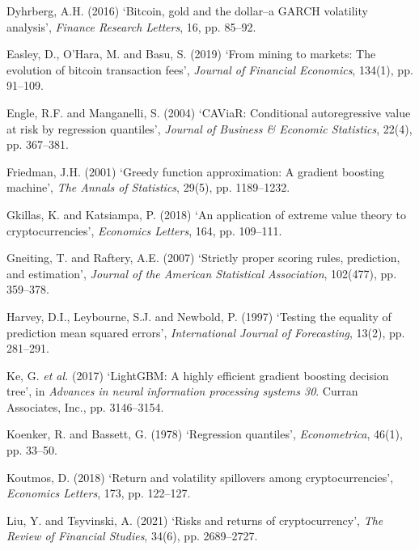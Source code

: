 \documentclass[
  a4paper,
  DIV=11,
  numbers=noendperiod]{scrreprt}
\newlength{\cslhangindent}
\newenvironment{CSLReferences}[2] %
 {\begin{list}{}{%
  \setlength{\itemindent}{0pt}
  \setlength{\leftmargin}{0pt}
  \setlength{\parsep}{0pt}
  \ifodd #1
   \setlength{\leftmargin}{\cslhangindent}
   \setlength{\itemindent}{-1\cslhangindent}
  \fi
  \setlength{\itemsep}{#2\baselineskip}}}
 {\end{list}}
\begin{document}
\begin{CSLReferences}{0}{1}
Dyhrberg, A.H. (2016) {`Bitcoin, gold and the dollar--a GARCH volatility
analysis'}, \emph{Finance Research Letters}, 16, pp. 85--92.

Easley, D., O'Hara, M. and Basu, S. (2019) {`From mining to markets: The
evolution of bitcoin transaction fees'}, \emph{Journal of Financial
Economics}, 134(1), pp. 91--109.

Engle, R.F. and Manganelli, S. (2004) {`{CAViaR}: Conditional
autoregressive value at risk by regression quantiles'}, \emph{Journal of
Business \& Economic Statistics}, 22(4), pp. 367--381.

Friedman, J.H. (2001) {`Greedy function approximation: A gradient
boosting machine'}, \emph{The Annals of Statistics}, 29(5), pp.
1189--1232.

Gkillas, K. and Katsiampa, P. (2018) {`An application of extreme value
theory to cryptocurrencies'}, \emph{Economics Letters}, 164, pp.
109--111.

Gneiting, T. and Raftery, A.E. (2007) {`Strictly proper scoring rules,
prediction, and estimation'}, \emph{Journal of the American Statistical
Association}, 102(477), pp. 359--378.

Harvey, D.I., Leybourne, S.J. and Newbold, P. (1997) {`Testing the
equality of prediction mean squared errors'}, \emph{International
Journal of Forecasting}, 13(2), pp. 281--291.

Ke, G. \emph{et al.} (2017) {`{LightGBM}: A highly efficient gradient
boosting decision tree'}, in \emph{Advances in neural information
processing systems 30}. Curran Associates, Inc., pp. 3146--3154.

Koenker, R. and Bassett, G. (1978) {`Regression quantiles'},
\emph{Econometrica}, 46(1), pp. 33--50.

Koutmos, D. (2018) {`Return and volatility spillovers among
cryptocurrencies'}, \emph{Economics Letters}, 173, pp. 122--127.

Liu, Y. and Tsyvinski, A. (2021) {`Risks and returns of
cryptocurrency'}, \emph{The Review of Financial Studies}, 34(6), pp.
2689--2727.


\end{CSLReferences}
\end{document}
